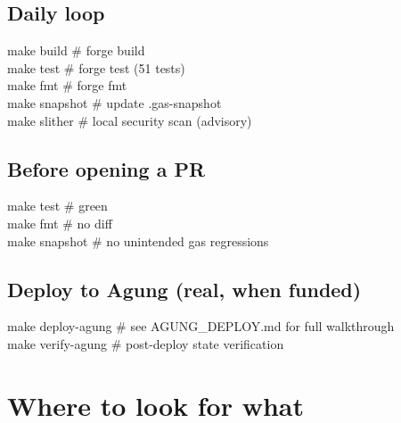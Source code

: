 \documentclass[11pt,a4paper]{article}
\begin{document}
\subsection{Daily loop}

\begin{codebox}
make build              \# forge build\\
make test               \# forge test (51 tests)\\
make fmt                \# forge fmt\\
make snapshot           \# update .gas-snapshot\\
make slither            \# local security scan (advisory)
\end{codebox}

\subsection{Before opening a PR}

\begin{codebox}
make test               \# green\\
make fmt                \# no diff\\
make snapshot           \# no unintended gas regressions
\end{codebox}

\subsection{Deploy to Agung (real, when funded)}

\begin{codebox}
make deploy-agung       \# see AGUNG\_DEPLOY.md for full walkthrough\\
make verify-agung       \# post-deploy state verification
\end{codebox}

\section{Where to look for what}
\end{document}
